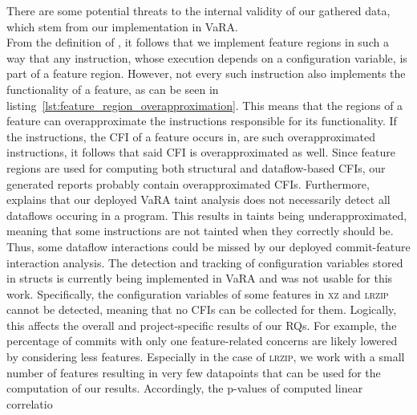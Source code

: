 There are some potential threats to the internal validity of our gathered data, which stem from our implementation in VaRA. \\
From the definition of , it follows that we implement feature regions in such a way that any instruction, whose execution depends on a configuration variable, is part of a feature region.
However, not every such instruction also implements the functionality of a feature, as can be seen in listing~\ref{lst:feature_region_overapproximation}.
This means that the regions of a feature can overapproximate the instructions responsible for its functionality.
If the instructions, the CFI of a feature occurs in, are such overapproximated instructions, it follows that said CFI is overapproximated as well.
Since feature regions are used for computing both structural and dataflow-based CFIs, our generated reports probably contain overapproximated CFIs.
Furthermore, \citet{sattler2023seal} explains that our deployed VaRA taint analysis does not necessarily detect all dataflows occuring in a program.
This results in taints being underapproximated, meaning that some instructions are not tainted when they correctly should be.
Thus, some dataflow interactions could be missed by our deployed commit-feature interaction analysis. 
The detection and tracking of configuration variables stored in structs is currently being implemented in VaRA and was not usable for this work.  
Specifically, the configuration variables of some features in \textsc{xz} and \textsc{lrzip} cannot be detected, meaning that no CFIs can be collected for them. 
Logically, this affects the overall and project-specific results of our RQs.
For example, the percentage of commits with only one feature-related concerns are likely lowered by considering less features. 
Especially in the case of \textsc{lrzip}, we work with a small number of features resulting in very few datapoints that can be used for the computation of our results.
Accordingly, the p-values of computed linear correlatio














